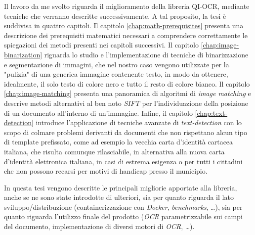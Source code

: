 Il lavoro da me svolto riguarda il miglioramento della libreria QI-OCR, mediante tecniche che verranno descritte successivamente. A tal proposito, la tesi \`e suddivisa in quattro capitoli. 
\newpage
Il capitolo \ref{chap:math-prerequisites} presenta una descrizione dei prerequisiti matematici necessari a comprendere correttamente le spiegazioni dei metodi presenti nei capitoli successivi. Il capitolo \ref{chap:image-binarization} riguarda lo studio e l'implementazione di tecniche di binarizzazione e segmentazione di immagini, che nel nostro caso vengono utilizzate per la "pulizia" di una generica immagine contenente testo, in modo da ottenere, idealmente, il solo testo di colore nero e tutto il resto di colore bianco. Il capitolo \ref{chap:image-matching} presenta una panoramica di algoritmi di \textit{image matching} e descrive metodi alternativi al ben noto \textit{SIFT} per l'individuazione della posizione di un documento all'interno di un'immagine. Infine, il capitolo \ref{chap:text-detection} introduce l'applicazione di tecniche avanzate di \textit{text-detection} con lo scopo di colmare problemi derivanti da documenti che non rispettano alcun tipo di template prefissato, come ad esempio la vecchia carta d'identit\`a cartacea italiana, che risulta comunque rilasciabile, in alternativa alla nuova carta d'identit\`a elettronica italiana, in casi di estrema esigenza o per tutti i cittadini che non possono recarsi per motivi di handicap presso il municipio.\par 
In questa tesi vengono descritte le principali migliorie apportate alla libreria, anche se ne sono state introdotte di ulteriori, sia per quanto riguarda il lato sviluppo/distribuzione (containerizzazione con \textit{Docker}, \textit{benchmarks}, \dots), sia per quanto riguarda l'utilizzo finale del prodotto (\textit{OCR} parametrizzabile sui campi del documento, implementazione di diversi motori di \textit{OCR}, \dots).
